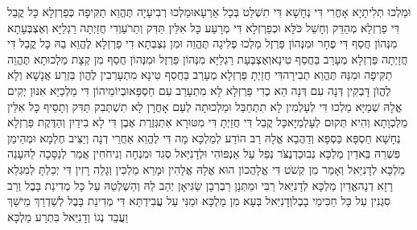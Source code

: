 \documentclass[../main/main.tex]{subfiles}
\begin{document}
\begin{multicols*}{\ncols}
וּמַלְכוּ תְלִיתָיָא אָחֳרִי דִּי נְחָשָׁא דִּי תִשְׁלַט בְּכָל אַרְעָא\PreVerseSpace{}וּמַלְכוּ רְבִיעָיָה תֶּהֱוֵא תַקִּיפָה כְּפַרְזְלָא כָּל קֳבֵל דִּי פַרְזְלָא מְהַדֵּק וְחָשֵׁל כֹּלָּא וּכְפַרְזְלָא דִּי מְרָעַע כָּל אִלֵּין תַּדִּק וְתֵרֹעַ\PreVerseSpace{}וְדִי חֲזַיְתָה רַגְלַיָּא וְאֶצְבְּעָתָא מִנְּהוֹן חֲסַף דִּי פֶחָר וּמִנְּהוֹן פַּרְזֶל מַלְכוּ פְלִיגָה תֶּהֱוֵה וּמִן נִצְבְּתָא דִי פַרְזְלָא לֶהֱוֵא בַהּ כָּל קֳבֵל דִּי חֲזַיְתָה פַּרְזְלָא מְעָרַב בַּחֲסַף טִינָא\PreVerseSpace{}וְאֶצְבְּעָת רַגְלַיָּא מִנְּהוֹן פַּרְזֶל וּמִנְּהוֹן חֲסַף מִן קְצָת מַלְכוּתָא תֶּהֱוֵה תַקִּיפָה וּמִנַּהּ תֶּהֱוֵא תְבִירָה\PreVerseSpace{}דִּי חֲזַיְתָ פַּרְזְלָא מְעָרַב בַּחֲסַף טִינָא מִתְעָרְבִין לֶהֱוֺן בִּזְרַע אֲנָשָׁא וְלָא לֶהֱוֺן דָּבְקִין דְּנָה עִם דְּנָה הֵא כְדִי פַרְזְלָא לָא מִתְעָרַב עִם חַסְפָּא\PreVerseSpace{}וּבְיוֹמֵיהוֹן דִּי מַלְכַיָּא אִנּוּן יְקִים אֱלָהּ שְׁמַיָּא מַלְכוּ דִּי לְעָלְמִין לָא תִתְחַבַּל וּמַלְכוּתָה לְעַם אָחֳרָן לָא תִשְׁתְּבִק תַּדִּק וְתָסֵיף כָּל אִלֵּין מַלְכְוָתָא וְהִיא תְּקוּם לְעָלְמַיָּא\PreVerseSpace{}כָּל קֳבֵל דִּי חֲזַיְתָ דִּי מִטּוּרָא אִתְגְּזֶרֶת אֶבֶן דִּי לָא בִידַיִן וְהַדֶּקֶת פַּרְזְלָא נְחָשָׁא חַסְפָּא כַּסְפָּא וְדַהֲבָא אֱלָהּ רַב הוֹדַע לְמַלְכָּא מָה דִּי לֶהֱוֵא אַחֲרֵי דְנָה וְיַצִּיב חֶלְמָא וּמְהֵימַן פִּשְׁרֵהּ \ClosedSection{}בֵּאדַיִן מַלְכָּא נְבוּכַדְנֶצֹּר נְפַל עַל אַנְפּוֹהִי וּלְדָנִיֵּאל סְגִד וּמִנְחָה וְנִיחֹחִין אֲמַר לְנַסָּכָה לֵהּ\PreVerseSpace{}עָנֵה מַלְכָּא לְדָנִיֵּאל וְאָמַר מִן קְשֹׁט דִּי אֱלָהֲכוֹן הוּא אֱלָהּ אֱלָהִין וּמָרֵא מַלְכִין וְגָלֵה רָזִין דִּי יְכֵלְתָּ לְמִגְלֵא רָזָא דְנָה\PreVerseSpace{}אֱדַיִן מַלְכָּא לְדָנִיֵּאל רַבִּי וּמַתְּנָן רַבְרְבָן שַׂגִּיאָן יְהַב לֵהּ וְהַשְׁלְטֵהּ עַל כָּל מְדִינַת בָּבֶל וְרַב סִגְנִין עַל כָּל חַכִּימֵי בָבֶל\PreVerseSpace{}וְדָנִיֵּאל בְּעָא מִן מַלְכָּא וּמַנִּי עַל עֲבִידְתָּא דִּי מְדִינַת בָּבֶל לְשַׁדְרַךְ מֵישַׁךְ וַעֲבֵד נְגוֹ וְדָנִיֵּאל בִּתְרַע מַלְכָּא\OpenSection{}\par

\end{multicols*}
\end{document}
